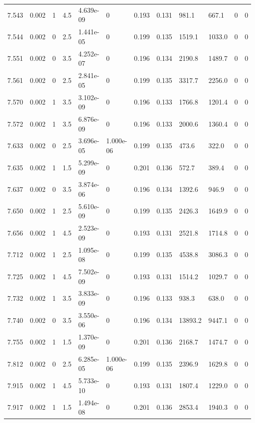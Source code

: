 \documentclass[preview]{standalone}
\begin{document}
{{{{{{{{\begin{tabular}{L{1.2cm}C{1.2cm} C{0.3cm}C{0.5cm} C{1.4cm}C{1.4cm} C{1.4cm}C{1.4cm} C{1.6cm}C{1.6cm} C{1.6cm}C{1.6cm}}
  7.543  &  0.002  & 1     & 4.5 &  4.639e-09  & 0  &  0.193&   0.131& 981.1 & 667.1   &  0 & 0  \\ 
  7.544  &  0.002  & 0     & 2.5 &  1.441e-05  & 0  &  0.199&   0.135& 1519.1 & 1033.0   &  0 & 0  \\ 
  7.551  &  0.002  & 0     & 3.5 &  4.252e-07  & 0  &  0.196&   0.134& 2190.8 & 1489.7   &  0 & 0  \\ 
  7.561  &  0.002  & 0     & 2.5 &  2.841e-05  & 0  &  0.199&   0.135& 3317.7 & 2256.0   &  0 & 0  \\ 
  7.570  &  0.002  & 1     & 3.5 &  3.102e-09  & 0  &  0.196&   0.133& 1766.8 & 1201.4   &  0 & 0  \\ 
  7.572  &  0.002  & 1     & 3.5 &  6.876e-09  & 0  &  0.196&   0.133& 2000.6 & 1360.4   &  0 & 0  \\ 
  7.633  &  0.002  & 0     & 2.5 &  3.696e-05  & 1.000e-06  &  0.199&   0.135& 473.6 & 322.0   &  0 & 0  \\ 
  7.635  &  0.002  & 1     & 1.5 &  5.299e-09  & 0  &  0.201&   0.136& 572.7 & 389.4   &  0 & 0  \\ 
  7.637  &  0.002  & 0     & 3.5 &  3.874e-06  & 0  &  0.196&   0.134& 1392.6 & 946.9   &  0 & 0  \\ 
  7.650  &  0.002  & 1     & 2.5 &  5.610e-09  & 0  &  0.199&   0.135& 2426.3 & 1649.9   &  0 & 0  \\ 
  7.656  &  0.002  & 1     & 4.5 &  2.523e-09  & 0  &  0.193&   0.131& 2521.8 & 1714.8   &  0 & 0  \\ 
  7.712  &  0.002  & 1     & 2.5 &  1.095e-08  & 0  &  0.199&   0.135& 4538.8 & 3086.3   &  0 & 0  \\ 
  7.725  &  0.002  & 1     & 4.5 &  7.502e-09  & 0  &  0.193&   0.131& 1514.2 & 1029.7   &  0 & 0  \\ 
  7.732  &  0.002  & 1     & 3.5 &  3.833e-09  & 0  &  0.196&   0.133& 938.3 & 638.0   &  0 & 0  \\ 
  7.740  &  0.002  & 0     & 3.5 &  3.550e-06  & 0  &  0.196&   0.134& 13893.2 & 9447.1   &  0 & 0  \\ 
  7.755  &  0.002  & 1     & 1.5 &  1.370e-09  & 0  &  0.201&   0.136& 2168.7 & 1474.7   &  0 & 0  \\ 
  7.812  &  0.002  & 0     & 2.5 &  6.285e-05  & 1.000e-06  &  0.199&   0.135& 2396.9 & 1629.8   &  0 & 0  \\ 
  7.915  &  0.002  & 1     & 4.5 &  5.733e-10  & 0  &  0.193&   0.131& 1807.4 & 1229.0   &  0 & 0  \\ 
  7.917  &  0.002  & 1     & 1.5 &  1.494e-08  & 0  &  0.201&   0.136& 2853.4 & 1940.3   &  0 & 0  \\ 

\end{tabular}}}}}}}}}
\end{document}
